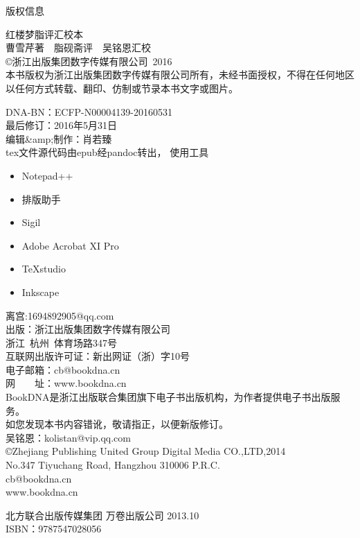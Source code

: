 

\begin{flushleft}
{\Huge \heiti 版权信息}

	
{红楼梦脂评汇校本}\\
曹雪芹著~~脂砚斋评~~吴铭恩汇校\\[2\baselineskip]\copyright 浙江出版集团数字传媒有限公司~2016\\
本书版权为浙江出版集团数字传媒有限公司所有，未经书面授权，不得在任何地区以任何方式转载、翻印、仿制或节录本书文字或图片。

DNA-BN：ECFP-N00004139-20160531\\
最后修订：2016年5月31日\\
编辑\&amp;制作：{肖若臻}\\

tex文件源代码由epub经pandoc转出，
使用工具
\begin{itemize}
	\item Notepad++
	\item 排版助手
	\item Sigil
	\item Adobe Acrobat XI Pro
	\item TeXstudio
	\item Inkscape
\end{itemize}
离宫:1694892905@qq.com\\

出版：浙江出版集团数字传媒有限公司\\
浙江~杭州~体育场路347号\\
互联网出版许可证：新出网证（浙）字10号\\
电子邮箱：cb@bookdna.cn\\
网　　址：www.bookdna.cn\\
BookDNA是浙江出版联合集团旗下电子书出版机构，为作者提供电子书出版服务。\\
如您发现本书内容错讹，敬请指正，以便新版修订。\\
吴铭恩：kolistan@vip.qq.com\\

\copyright Zhejiang Publishing United Group Digital Media CO.,LTD,2014\\
No.347 Tiyuchang Road, Hangzhou 310006 P.R.C.\\
cb@bookdna.cn\\
www.bookdna.cn

北方联合出版传媒集团 万卷出版公司 2013.10\\
ISBN：9787547028056
\end{flushleft}
